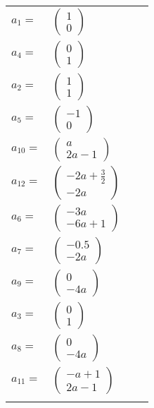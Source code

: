 \documentclass[1p]{elsarticle_modified}
\theoremstyle{definition}
\begin{document}
\begin{tabular}{m{7pt} m{180pt} m{7pt} m{180pt} }
\flushright $a_{1}=$&$\begin{pmatrix}1\\0\end{pmatrix}$ \\
\flushright $a_{4}=$&$\begin{pmatrix}0\\1\end{pmatrix}$ \\
\flushright $a_{2}=$&$\begin{pmatrix}1\\1\end{pmatrix}$ \\
\flushright $a_{5}=$&$\begin{pmatrix}-1\\0\end{pmatrix}$ \\
\flushright $a_{10}=$&$\begin{pmatrix}a\\2 a-1\end{pmatrix}$ \\
\flushright $a_{12}=$&$\begin{pmatrix}-2 a+\frac{3}{2}\\-2 a\end{pmatrix}$ \\
\flushright $a_{6}=$&$\begin{pmatrix}-3 a\\-6 a+1\end{pmatrix}$ \\
\flushright $a_{7}=$&$\begin{pmatrix}-0.5\\-2 a\end{pmatrix}$ \\
\flushright $a_{9}=$&$\begin{pmatrix}0\\-4 a\end{pmatrix}$ \\
\flushright $a_{3}=$&$\begin{pmatrix}0\\1\end{pmatrix}$ \\
\flushright $a_{8}=$&$\begin{pmatrix}0\\-4 a\end{pmatrix}$ \\
\flushright $a_{11}=$&$\begin{pmatrix}- a+1\\2 a-1\end{pmatrix}$\\&\end{tabular}
\end{document}

